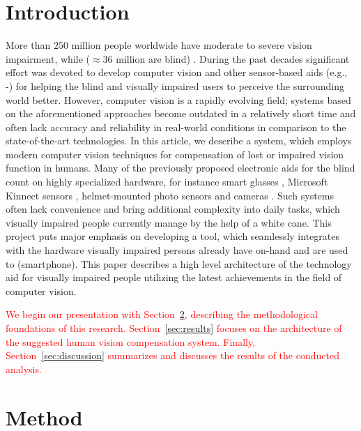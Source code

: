 \documentclass[10pt,conference,compsocconf]{IEEEtran}
\begin{document}
\section{Introduction}
\label{sec:introduction}
More than $250$ million people worldwide have moderate to severe vision impairment, while ($\approx 36$ million are blind) \cite{Bourne}. During the past decades significant effort was devoted to develop computer vision and other sensor-based aids (e.g., \cite{Caraiman}-\cite{Zientara}) for helping the blind and visually impaired users to perceive the surrounding world better. However, computer vision is a rapidly evolving field; systems based on the aforementioned approaches become outdated in a relatively short time and often lack accuracy and reliability in real-world conditions in comparison to the state-of-the-art technologies. In this article, we describe a system, which employs modern computer vision techniques for compensation of lost or impaired vision function in humans. Many of the previously proposed electronic aids for the blind count on highly specialized hardware, for instance smart glasses \cite{Zientara}, Microsoft Kinnect sensors \cite{Owayjan}, helmet-mounted photo sensors and cameras \cite{Dunai}. Such systems often lack convenience and bring additional complexity into daily tasks, which visually impaired people currently manage by the help of a white cane. This project puts major emphasis on developing a tool, which seamlessly integrates with the hardware visually impaired persons already have on-hand and are used to (smartphone). This paper describes a high level architecture of the technology aid for visually impaired people utilizing the latest achievements in the field of computer vision. 

\textcolor{red}{We begin our presentation with Section~\ref{sec:method}, describing the methodological foundations of this research. Section~\ref{sec:results} focuses on the architecture of the suggested human vision compensation system. Finally, Section~\ref{sec:discussion} summarizes and discusses the results of the conducted analysis.}


\section{Method}
\label{sec:method}
\end{document}
